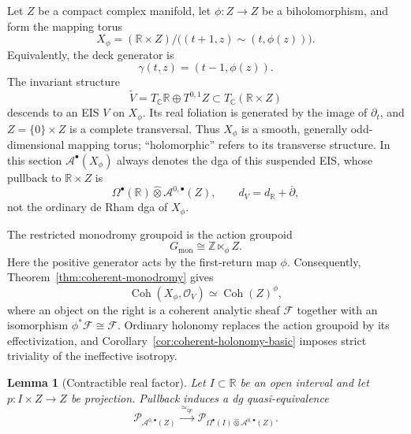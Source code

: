 \documentclass[12pt]{amsart}
\newtheorem{lem}[thm]{Lemma}
\theoremstyle{definition}
\theoremstyle{remark}
\numberwithin{equation}{section}
\newcommand{\CA}{\mathcal A}
\newcommand{\CO}{\mathcal O}
\newcommand{\C}{\mathbb C}
\newcommand{\R}{\mathbb R}
\newcommand{\delb}{\overline{\partial}}
\begin{document}
Let \(Z\) be a compact complex manifold, let
\(\phi:Z\to Z\) be a biholomorphism, and form the mapping torus
\[
X_\phi
=
(\mathbb R\times Z)/
\bigl((t+1,z)\sim(t,\phi(z))\bigr).
\]
Equivalently, the deck generator is
\[
\gamma(t,z)=(t-1,\phi(z)).
\]
The invariant structure
\[
\widetilde V
=
T_{\C}\mathbb R\oplus T^{0,1}Z
\subset
T_{\C}(\mathbb R\times Z)
\]
descends to an EIS \(V\) on \(X_\phi\).  Its real foliation is generated
by the image of \(\partial_t\), and \(Z=\{0\}\times Z\) is a complete
transversal.  Thus \(X_\phi\) is a smooth, generally odd-dimensional
mapping torus; ``holomorphic'' refers to its transverse structure.  In this
section \(\CA^\bullet(X_\phi)\) always denotes the dga of this suspended
EIS, whose pullback to \(\R\times Z\) is
\[
\Omega^\bullet(\R)\widehat\otimes\CA^{0,\bullet}(Z),
\qquad
d_V=d_{\R}+\delb,
\]
not the ordinary de Rham dga of \(X_\phi\).

The restricted monodromy groupoid is the action groupoid
\[
G_{\mathrm{mon}}\cong\mathbb Z\ltimes_\phi Z.
\]
Here the positive generator acts by the first-return map \(\phi\).
Consequently, Theorem~\ref{thm:coherent-monodromy} gives
\[
\operatorname{Coh}(X_\phi,\CO_V)
\simeq
\operatorname{Coh}(Z)^\phi,
\]
where an object on the right is a coherent analytic sheaf
\(\mathcal F\) together with an isomorphism
\(\phi^*\mathcal F\cong\mathcal F\).  Ordinary holonomy replaces the
action groupoid by its effectivization, and
Corollary~\ref{cor:coherent-holonomy-basic} imposes strict triviality of
the ineffective isotropy.

\begin{lem}[Contractible real factor]
\label{lem:contractible-real-factor}
Let \(I\subset\R\) be an open interval and let
\(p:I\times Z\to Z\) be projection.  Pullback induces a dg
quasi-equivalence
\[
\mathcal P_{\CA^{0,\bullet}(Z)}
\xrightarrow{\ \simeq_{\mathrm{qe}}\ }
\mathcal P_{\Omega^\bullet(I)\widehat\otimes
\CA^{0,\bullet}(Z)}.
\]
\end{lem}
\end{document}
